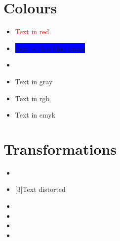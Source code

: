 \documentclass[10pt]{article}
\begin{document}
%
\section{Colours}
\begin{itemize}
\item \textcolor{red}{Text in red}
\item \colorbox{blue}{Text with a blue frame}
\item {}
%
\item \textcolor{color1}{Text in gray}
%
\item \textcolor{color2}{Text in rgb}
%
\item \textcolor{color3}{Text in cmyk}
\end{itemize}
%
\section{Transformations}
\begin{itemize}
\item \scalebox{2}{Text scaled twice}
\item \scalebox{2}[3]{Text distorted}
\item {}
\item {}
\item {}
\item {}
\end{itemize}
%
\end{document}
